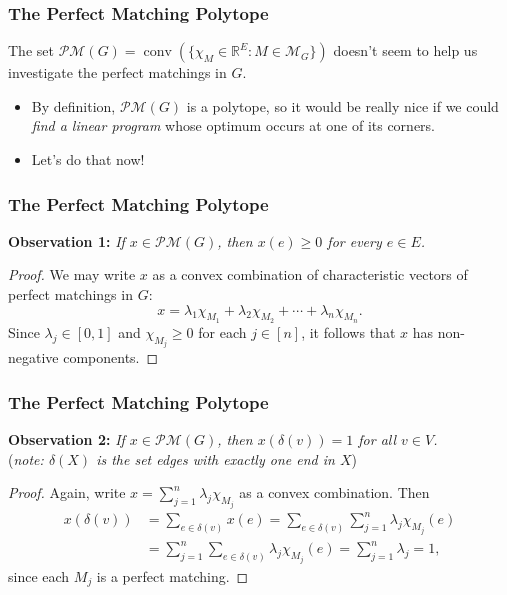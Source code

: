 \begin{frame}
\frametitle{The Perfect Matching Polytope}
The set \( \mathcal{P} \mathcal{M} (G) = \operatorname{conv} (\{ \chi_{M} \in \mathbb{R}^{E} : M \in \mathcal{M} _{G}  \} ) \) doesn't seem to help us investigate the perfect matchings in \( G \).
\begin{itemize}
	\item<2-> By definition, \( \mathcal{P} \mathcal{M} (G) \) is a polytope, so it would be really nice if we could \emph{find a linear program} whose optimum occurs at one of its corners. 
	\item<3> Let's do that now!
\end{itemize}
\end{frame}

\begin{frame}
\frametitle{The Perfect Matching Polytope}
\textbf{Observation 1:} \emph{If \( x \in \mathcal{P} \mathcal{M} (G) \), then \( x(e) \geq 0 \) for every \( e \in E \).} \pause
\begin{proof}
	We may write \( x \) as a convex combination of characteristic vectors of perfect matchings in \( G \): \[ x = \lambda_1 \chi_{M_1} + \lambda_2 \chi_{M_2} + \cdots + \lambda_{n} \chi_{M_{n} } . \] \pause Since \( \lambda_{j} \in [0, 1] \) and \( \chi_{M_{j} } \geq 0 \) for each \( j \in [n] \), it follows that \( x \) has non-negative components.
\end{proof}
\end{frame}

\begin{frame}
\frametitle{The Perfect Matching Polytope}
\textbf{Observation 2:} \emph{If \( x \in \mathcal{P} \mathcal{M} (G) \), then \( x(\delta (v)) = 1 \) for all \( v \in V \).}\\
\pause (\emph{note: \( \delta (X) \) is the set edges with exactly one end in \( X \)})\pause

\begin{proof}
Again, write \( x = \sum_{j=1}^{n} \lambda_{j} \chi_{M_{j} }  \) as a convex combination. Then \pause
\begin{align*}
	x(\delta (v)) &= \sum_{e \in \delta (v)}^{} x(e) = \sum_{e \in \delta (v)}^{} \sum_{j=1}^{n} \lambda_{j} \chi_{M_{j} } (e) \\
		      &= \sum_{j=1}^{n} \sum_{e \in \delta (v)}^{} \lambda_{j} \chi_{M_{j} } (e) = \sum_{j=1}^{n} \lambda_{j} = 1,
\end{align*}
since each \( M_{j}  \) is a perfect matching.
\end{proof}
\end{frame}

